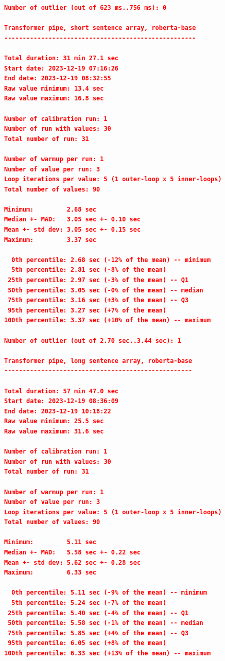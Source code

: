 \begin{lstlisting}[language=json]
Number of outlier (out of 623 ms..756 ms): 0

Transformer pipe, short sentence array, roberta-base
----------------------------------------------------

Total duration: 31 min 27.1 sec
Start date: 2023-12-19 07:16:26
End date: 2023-12-19 08:32:55
Raw value minimum: 13.4 sec
Raw value maximum: 16.8 sec

Number of calibration run: 1
Number of run with values: 30
Total number of run: 31

Number of warmup per run: 1
Number of value per run: 3
Loop iterations per value: 5 (1 outer-loop x 5 inner-loops)
Total number of values: 90

Minimum:         2.68 sec
Median +- MAD:   3.05 sec +- 0.10 sec
Mean +- std dev: 3.05 sec +- 0.15 sec
Maximum:         3.37 sec

  0th percentile: 2.68 sec (-12% of the mean) -- minimum
  5th percentile: 2.81 sec (-8% of the mean)
 25th percentile: 2.97 sec (-3% of the mean) -- Q1
 50th percentile: 3.05 sec (-0% of the mean) -- median
 75th percentile: 3.16 sec (+3% of the mean) -- Q3
 95th percentile: 3.27 sec (+7% of the mean)
100th percentile: 3.37 sec (+10% of the mean) -- maximum

Number of outlier (out of 2.70 sec..3.44 sec): 1

Transformer pipe, long sentence array, roberta-base
---------------------------------------------------

Total duration: 57 min 47.0 sec
Start date: 2023-12-19 08:36:09
End date: 2023-12-19 10:18:22
Raw value minimum: 25.5 sec
Raw value maximum: 31.6 sec

Number of calibration run: 1
Number of run with values: 30
Total number of run: 31

Number of warmup per run: 1
Number of value per run: 3
Loop iterations per value: 5 (1 outer-loop x 5 inner-loops)
Total number of values: 90

Minimum:         5.11 sec
Median +- MAD:   5.58 sec +- 0.22 sec
Mean +- std dev: 5.62 sec +- 0.28 sec
Maximum:         6.33 sec

  0th percentile: 5.11 sec (-9% of the mean) -- minimum
  5th percentile: 5.24 sec (-7% of the mean)
 25th percentile: 5.40 sec (-4% of the mean) -- Q1
 50th percentile: 5.58 sec (-1% of the mean) -- median
 75th percentile: 5.85 sec (+4% of the mean) -- Q3
 95th percentile: 6.05 sec (+8% of the mean)
100th percentile: 6.33 sec (+13% of the mean) -- maximum


\end{lstlisting}
